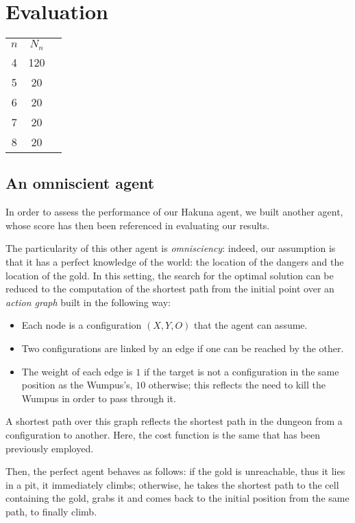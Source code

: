 \documentclass{llncs}
\begin{document}
\section{Evaluation}


\begin{tabular}{ccc}
$n$ & $N_n$ \\
4 & 120 \\
5 &  20 \\
6 &  20 \\
7 &  20 \\
8 &  20 \\
\end{tabular}


\subsection{An omniscient agent}

In order to assess the performance of our Hakuna agent, we built another agent, whose score has then been referenced in evaluating our results.

The particularity of this other agent is \emph{omnisciency}: indeed, our assumption is that it has a perfect knowledge of the world: the location of the dangers and the location of the gold.
In this setting, the search for the optimal solution can be reduced to the computation of the shortest path from the initial point over an \emph{action graph} built in the following way:
\begin{itemize}
	\item Each node is a configuration $(X,Y,O)$ that the agent can assume.
	\item Two configurations are linked by an edge if one can be reached by the other.
	\item The weight of each edge is $1$ if the target is not a configuration in the same position as the Wumpus's, $10$ otherwise; this reflects the need to kill the Wumpus in order to pass through it.
\end{itemize}
A shortest path over this graph reflects the shortest path in the dungeon from a configuration to another.
Here, the cost function is the same that has been previously employed.

Then, the perfect agent behaves as follows: if the gold is unreachable, thus it lies in a pit, it immediately climbs; otherwise, he takes the shortest path to the cell containing the gold, grabs it and comes back to the initial position from the same path, to finally climb.

%
%
%
%

\newpage

\appendix
\footnotesize

\begin{multicols}{2}

\end{multicols}


\end{document}
